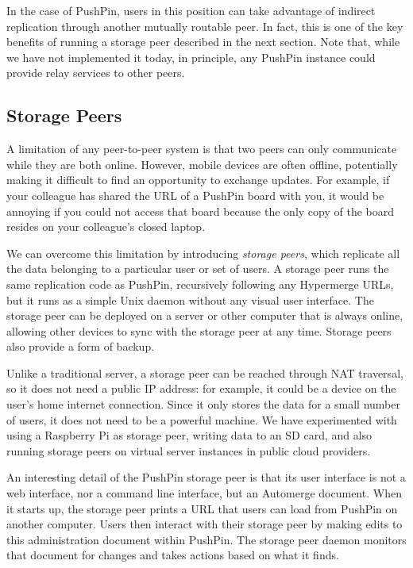 \documentclass[sigplan,10pt]{acmart}
\begin{document}
In the case of PushPin, users in this position can take advantage of indirect replication through another mutually routable peer. In fact, this is one of the key benefits of running a storage peer described in the next section. Note that, while we have not implemented it today, in principle, any PushPin instance could provide relay services to other peers. 

\subsection{Storage Peers}

A limitation of any peer-to-peer system is that two peers can only communicate while they are both online.
However, mobile devices are often offline, potentially making it difficult to find an opportunity to exchange updates.
For example, if your colleague has shared the URL of a PushPin board with you, it would be annoying if you could not access that board because the only copy of the board resides on your colleague's closed laptop.

We can overcome this limitation by introducing \emph{storage peers}, which replicate all the data belonging to a particular user or set of users.
A storage peer runs the same replication code as PushPin, recursively following any Hypermerge URLs, but it runs as a simple Unix daemon without any visual user interface.
The storage peer can be deployed on a server or other computer that is always online, allowing other devices to sync with the storage peer at any time.
Storage peers also provide a form of backup.

Unlike a traditional server, a storage peer can be reached through NAT traversal, so it does not need a public IP address: for example, it could be a device on the user's home internet connection.
Since it only stores the data for a small number of users, it does not need to be a powerful machine.
We have experimented with using a Raspberry Pi as storage peer, writing data to an SD card, and also running storage peers on virtual server instances in public cloud providers.

An interesting detail of the PushPin storage peer is that its user interface is not a web interface, nor a command line interface, but an Automerge document.
When it starts up, the storage peer prints a URL that users can load from PushPin on another computer.
Users then interact with their storage peer by making edits to this administration document within PushPin.
The storage peer daemon monitors that document for changes and takes actions based on what it finds.
\end{document}
